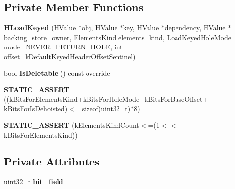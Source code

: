 \subsection*{Private Member Functions}
\begin{DoxyCompactItemize}
\item 
{\bfseries H\+Load\+Keyed} (\hyperlink{classv8_1_1internal_1_1_h_value}{H\+Value} $\ast$obj, \hyperlink{classv8_1_1internal_1_1_h_value}{H\+Value} $\ast$key, \hyperlink{classv8_1_1internal_1_1_h_value}{H\+Value} $\ast$dependency, \hyperlink{classv8_1_1internal_1_1_h_value}{H\+Value} $\ast$backing\+\_\+store\+\_\+owner, Elements\+Kind elements\+\_\+kind, Load\+Keyed\+Hole\+Mode mode=N\+E\+V\+E\+R\+\_\+\+R\+E\+T\+U\+R\+N\+\_\+\+H\+O\+LE, int offset=k\+Default\+Keyed\+Header\+Offset\+Sentinel)\hypertarget{classv8_1_1internal_1_1_h_load_keyed_ad0dcd4623a9055f1d845d95dc2ad4823}{}\label{classv8_1_1internal_1_1_h_load_keyed_ad0dcd4623a9055f1d845d95dc2ad4823}

\item 
bool {\bfseries Is\+Deletable} () const  override\hypertarget{classv8_1_1internal_1_1_h_load_keyed_a553f8c16243706eb0b31c4000f319957}{}\label{classv8_1_1internal_1_1_h_load_keyed_a553f8c16243706eb0b31c4000f319957}

\item 
{\bfseries S\+T\+A\+T\+I\+C\+\_\+\+A\+S\+S\+E\+RT} ((k\+Bits\+For\+Elements\+Kind+k\+Bits\+For\+Hole\+Mode+k\+Bits\+For\+Base\+Offset+                                                           k\+Bits\+For\+Is\+Dehoisted)$<$=sizeof(uint32\+\_\+t)$\ast$8)\hypertarget{classv8_1_1internal_1_1_h_load_keyed_a88532245da762f874085ed86b08f794e}{}\label{classv8_1_1internal_1_1_h_load_keyed_a88532245da762f874085ed86b08f794e}

\item 
{\bfseries S\+T\+A\+T\+I\+C\+\_\+\+A\+S\+S\+E\+RT} (k\+Elements\+Kind\+Count$<$=(1$<$$<$ k\+Bits\+For\+Elements\+Kind))\hypertarget{classv8_1_1internal_1_1_h_load_keyed_a5590d5afb455afdd55546e1988c0b42c}{}\label{classv8_1_1internal_1_1_h_load_keyed_a5590d5afb455afdd55546e1988c0b42c}

\end{DoxyCompactItemize}
\subsection*{Private Attributes}
\begin{DoxyCompactItemize}
\item 
uint32\+\_\+t {\bfseries bit\+\_\+field\+\_\+}\hypertarget{classv8_1_1internal_1_1_h_load_keyed_ac4bcaca9abaca20e1899dab3ee12184f}{}\label{classv8_1_1internal_1_1_h_load_keyed_ac4bcaca9abaca20e1899dab3ee12184f}

\end{DoxyCompactItemize}
